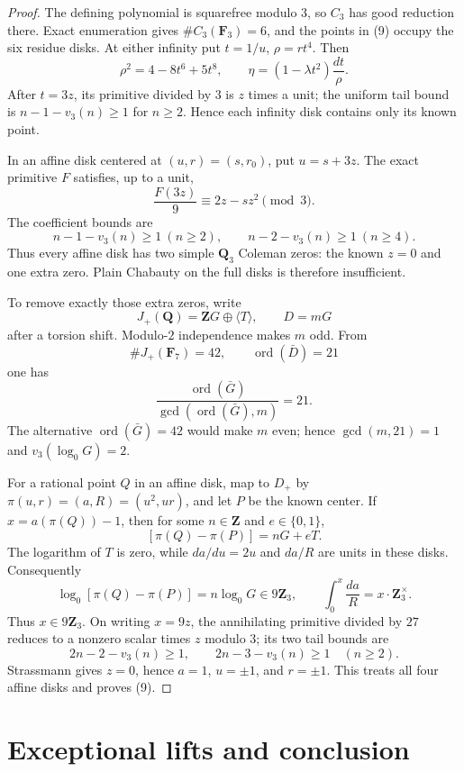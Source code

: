 \documentclass[11pt]{article}
\newcommand{\Q}{\mathbf Q}
\begin{document}
\begin{proof}
The defining polynomial is squarefree modulo \(3\), so \(C_3\) has good
reduction there.  Exact enumeration gives $\#C_3(\mathbf F_3)=6$, and the
points in (9) occupy the six residue disks.  At either infinity put
\(t=1/u\), \(\rho=rt^4\).  Then
\[
 \rho^2=4-8t^6+5t^8,\qquad
 \eta=(1-\lambda t^2)\frac{dt}{\rho}.
\]
After $t=3z$, its primitive divided by $3$ is $z$ times a unit; the
uniform tail bound is $n-1-v_3(n)\ge1$ for $n\ge2$.  Hence each infinity
disk contains only its known point.

In an affine disk centered at $(u,r)=(s,r_0)$, put $u=s+3z$.  The exact
primitive $F$ satisfies, up to a unit,
\[
 \frac{F(3z)}9\equiv2z-sz^2\pmod3.                 \tag{10}
\]
The coefficient bounds are
\[
 n-1-v_3(n)\ge1\ (n\ge2),\qquad
 n-2-v_3(n)\ge1\ (n\ge4).
\]
Thus every affine disk has two simple $\Q_3$ Coleman zeros: the known
$z=0$ and one extra zero.  Plain Chabauty on the full disks is therefore
insufficient.

To remove exactly those extra zeros, write
\[
 J_+(\Q)=\mathbf ZG\oplus\langle T\rangle,\qquad D=mG
\]
after a torsion shift.  Modulo-$2$ independence makes $m$ odd.  From
\[
 \#J_+(\mathbf F_7)=42,\qquad \operatorname{ord}(\bar D)=21
\]
one has
\[
 \frac{\operatorname{ord}(\bar G)}
 {\gcd(\operatorname{ord}(\bar G),m)}=21.
\]
The alternative $\operatorname{ord}(\bar G)=42$ would make $m$ even;
hence $\gcd(m,21)=1$ and \(v_3(\log_0G)=2\).

For a rational point $Q$ in an affine disk, map to $D_+$ by
\(\pi(u,r)=(a,R)=(u^2,ur)\), and let $P$ be the known center.  If
$x=a(\pi(Q))-1$, then for some \(n\in\mathbf Z\) and \(e\in\{0,1\}\),
\[
 [\pi(Q)-\pi(P)]=nG+eT.
\]
The logarithm of \(T\) is zero, while \(da/du=2u\) and \(da/R\) are units
in these disks.  Consequently
\[
 \log_0[\pi(Q)-\pi(P)]=n\log_0G\in9\mathbf Z_3,\qquad
 \int_0^x\frac{da}{R}=x\cdot\mathbf Z_3^\times.
\]
Thus $x\in9\mathbf Z_3$.  On writing $x=9z$, the annihilating primitive
divided by $27$ reduces to a nonzero scalar times $z$ modulo $3$; its two
tail bounds are
\[
2n-2-v_3(n)\ge1,\qquad2n-3-v_3(n)\ge1\quad(n\ge2).
\]
Strassmann gives $z=0$, hence $a=1$, $u=\pm1$, and $r=\pm1$.  This treats
all four affine disks and proves (9).
\end{proof}

\section{Exceptional lifts and conclusion}
\end{document}
